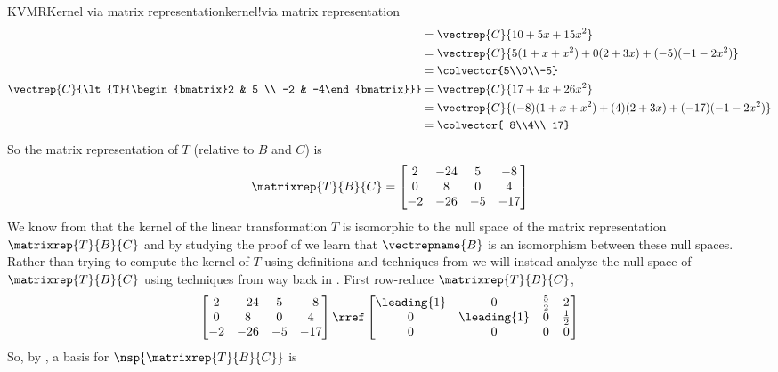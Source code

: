 \begin{example}{KVMR}{Kernel via matrix representation}{kernel!via matrix representation}
\begin{align*}
&=\vectrep{C}{10+5x+15x^2}\\
&=\vectrep{C}{5(1+x+x^2)+0(2+3x)+(-5)(-1-2x^2)}\\
&=\colvector{5\\0\\-5}\\
%
\vectrep{C}{\lt{T}{\begin{bmatrix}2 & 5 \\ -2 & -4\end{bmatrix}}}
&=\vectrep{C}{17+4x+26x^2}\\
&=\vectrep{C}{(-8)(1+x+x^2)+(4)(2+3x)+(-17)(-1-2x^2)}\\
&=\colvector{-8\\4\\-17}
%
\end{align*}
%
So the matrix representation of $T$ (relative to $B$ and $C$) is
%
\begin{equation*}
\matrixrep{T}{B}{C}
=
\begin{bmatrix}
 2 & -24 & 5 & -8 \\
 0 & 8 & 0 & 4 \\
 -2 & -26 & -5 & -17
\end{bmatrix}
\end{equation*}
%
We know from  that the kernel of the linear transformation $T$ is isomorphic to the null space of the matrix representation $\matrixrep{T}{B}{C}$ and by studying the proof of  we learn that $\vectrepname{B}$ is an isomorphism between these null spaces. Rather than trying to compute the kernel of $T$ using definitions and techniques from  we will instead analyze the null space of $\matrixrep{T}{B}{C}$ using techniques from way back in .  First row-reduce $\matrixrep{T}{B}{C}$,
 \begin{equation*}
 \begin{bmatrix}
 2 & -24 & 5 & -8 \\
 0 & 8 & 0 & 4 \\
 -2 & -26 & -5 & -17
 \end{bmatrix}
 \rref
 \begin{bmatrix}
  \leading{1} & 0 & \frac{5}{2} & 2 \\
  0 & \leading{1} & 0 & \frac{1}{2} \\
  0 & 0 & 0 & 0
 \end{bmatrix}
 \end{equation*}
So, by , a basis for $\nsp{\matrixrep{T}{B}{C}}$ is
%

\end{example}
